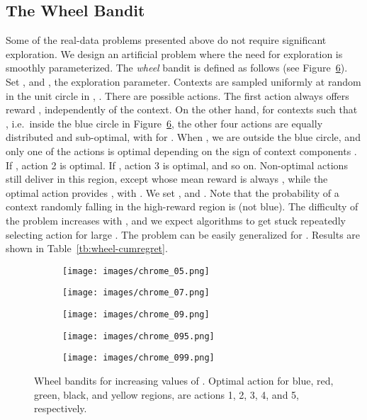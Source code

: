 \documentclass{article} \usepackage{iclr2018_conference,times}
\begin{document}
\subsection{The Wheel Bandit}
Some of the real-data problems presented above do not require significant exploration.
We design an artificial problem where the need for exploration is smoothly parameterized.
The \emph{wheel} bandit is defined as follows (see Figure~\ref{fig:cb}).
Set , and , the exploration parameter.
Contexts are sampled uniformly at random in the unit circle in , .
There are  possible actions.
The first action  always offers reward , independently of the context.
On the other hand, for contexts such that , i.e.\ inside the blue circle in Figure~\ref{fig:cb}, the other four actions are equally distributed and sub-optimal, with  for .
When , we are outside the blue circle, and only one of the actions  is optimal depending on the sign of context components .
If , action 2 is optimal.
If , action 3 is optimal, and so on.
Non-optimal actions still deliver  in this region, except  whose mean reward is always , while the optimal action provides , with .
We set , and .
Note that the probability of a context randomly falling in the high-reward region is  (not blue).
The difficulty of the problem increases with , and we expect algorithms to get stuck repeatedly selecting action  for large .
The problem can be easily generalized for .
Results are shown in Table~\ref{tb:wheel-cumregret}. 

\begin{figure}[t]
\begin{subfigure}[t]{0.18\textwidth}
  \centering
  \texttt{[image: images/chrome\_05.png]}
  \caption{}
  \label{fig:cb05}
\end{subfigure}\begin{subfigure}[t]{0.18\textwidth}
  \centering
  \texttt{[image: images/chrome\_07.png]}
  \caption{}
  \label{fig:cb07}
\end{subfigure}\begin{subfigure}[t]{0.18\textwidth}
  \centering
  \texttt{[image: images/chrome\_09.png]}
  \caption{}
  \label{fig:cb09}
\end{subfigure}\begin{subfigure}[t]{0.18\textwidth}
  \centering
  \texttt{[image: images/chrome\_095.png]}
  \caption{}
  \label{fig:cb095}
\end{subfigure}\begin{subfigure}[t]{0.18\textwidth}
  \centering
  \texttt{[image: images/chrome\_099.png]}
  \caption{}
  \label{fig:cb099}
\end{subfigure}
\caption{Wheel bandits for increasing values of . Optimal action for blue, red, green, black, and yellow regions, are actions 1, 2, 3, 4, and 5, respectively.}
\label{fig:cb}
\end{figure}
\end{document}
